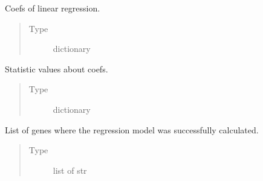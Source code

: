 \documentclass[letterpaper,10pt,english]{sphinxmanual}
\begin{document}
\begin{fulllineitems}
\begin{fulllineitems}
\begin{quote}
\begin{description}
\end{description}\end{quote}

\end{fulllineitems}


\begin{fulllineitems}
\label{\detokenize{modules/celloracle:celloracle.Net.coefs_dict}}
Coefs of linear regression.
\begin{quote}\begin{description}
\item[{Type}] \leavevmode
dictionary

\end{description}\end{quote}

\end{fulllineitems}


\begin{fulllineitems}
\label{\detokenize{modules/celloracle:celloracle.Net.stats_dict}}
Statistic values about coefs.
\begin{quote}\begin{description}
\item[{Type}] \leavevmode
dictionary

\end{description}\end{quote}

\end{fulllineitems}


\begin{fulllineitems}
\label{\detokenize{modules/celloracle:celloracle.Net.fitted_genes}}
List of genes where the regression model was successfully calculated.
\begin{quote}\begin{description}
\item[{Type}] \leavevmode
list of str


\end{description}
\end{quote}
\end{fulllineitems}
\end{fulllineitems}
\end{document}
